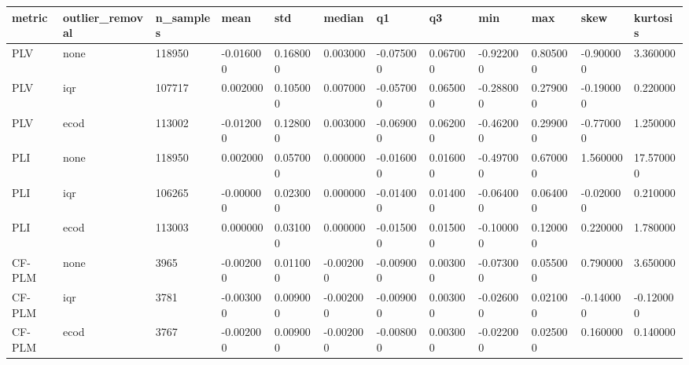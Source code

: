 \begin{tabular}{llllllllllll}
\toprule
metric & outlier\_removal & n\_samples & mean & std & median & q1 & q3 & min & max & skew & kurtosis \\
\midrule
PLV & none & 118950 & -0.016000 & 0.168000 & 0.003000 & -0.075000 & 0.067000 & -0.922000 & 0.805000 & -0.900000 & 3.360000 \\
PLV & iqr & 107717 & 0.002000 & 0.105000 & 0.007000 & -0.057000 & 0.065000 & -0.288000 & 0.279000 & -0.190000 & 0.220000 \\
PLV & ecod & 113002 & -0.012000 & 0.128000 & 0.003000 & -0.069000 & 0.062000 & -0.462000 & 0.299000 & -0.770000 & 1.250000 \\
PLI & none & 118950 & 0.002000 & 0.057000 & 0.000000 & -0.016000 & 0.016000 & -0.497000 & 0.670000 & 1.560000 & 17.570000 \\
PLI & iqr & 106265 & -0.000000 & 0.023000 & 0.000000 & -0.014000 & 0.014000 & -0.064000 & 0.064000 & -0.020000 & 0.210000 \\
PLI & ecod & 113003 & 0.000000 & 0.031000 & 0.000000 & -0.015000 & 0.015000 & -0.100000 & 0.120000 & 0.220000 & 1.780000 \\
CF-PLM & none & 3965 & -0.002000 & 0.011000 & -0.002000 & -0.009000 & 0.003000 & -0.073000 & 0.055000 & 0.790000 & 3.650000 \\
CF-PLM & iqr & 3781 & -0.003000 & 0.009000 & -0.002000 & -0.009000 & 0.003000 & -0.026000 & 0.021000 & -0.140000 & -0.120000 \\
CF-PLM & ecod & 3767 & -0.002000 & 0.009000 & -0.002000 & -0.008000 & 0.003000 & -0.022000 & 0.025000 & 0.160000 & 0.140000 \\
\bottomrule
\end{tabular}
